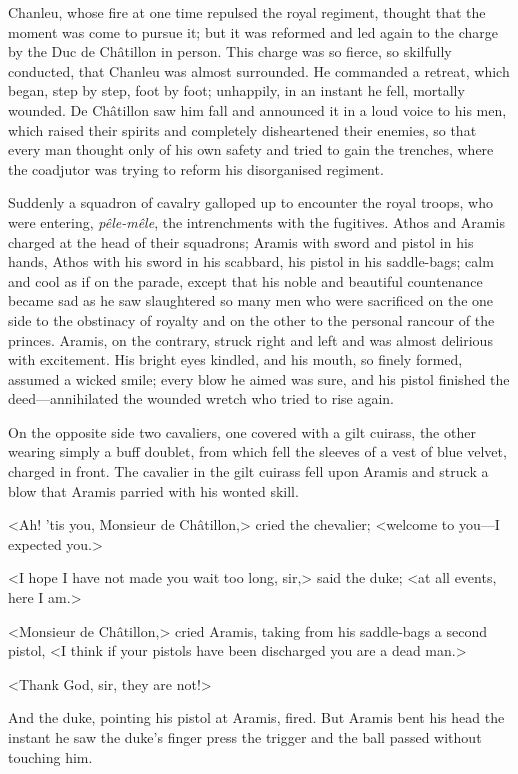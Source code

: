 Chanleu, whose fire at one time repulsed the royal regiment, thought that the moment was come to pursue it; but it was reformed and led again to the charge by the Duc de Châtillon in person. This charge was so fierce, so skilfully conducted, that Chanleu was almost surrounded. He commanded a retreat, which began, step by step, foot by foot; unhappily, in an instant he fell, mortally wounded. De Châtillon saw him fall and announced it in a loud voice to his men, which raised their spirits and completely disheartened their enemies, so that every man thought only of his own safety and tried to gain the trenches, where the coadjutor was trying to reform his disorganised regiment.

Suddenly a squadron of cavalry galloped up to encounter the royal troops, who were entering, \textit{pêle-mêle}, the intrenchments with the fugitives. Athos and Aramis charged at the head of their squadrons; Aramis with sword and pistol in his hands, Athos with his sword in his scabbard, his pistol in his saddle-bags; calm and cool as if on the parade, except that his noble and beautiful countenance became sad as he saw slaughtered so many men who were sacrificed on the one side to the obstinacy of royalty and on the other to the personal rancour of the princes. Aramis, on the contrary, struck right and left and was almost delirious with excitement. His bright eyes kindled, and his mouth, so finely formed, assumed a wicked smile; every blow he aimed was sure, and his pistol finished the deed—annihilated the wounded wretch who tried to rise again.

On the opposite side two cavaliers, one covered with a gilt cuirass, the other wearing simply a buff doublet, from which fell the sleeves of a vest of blue velvet, charged in front. The cavalier in the gilt cuirass fell upon Aramis and struck a blow that Aramis parried with his wonted skill.

<Ah! 'tis you, Monsieur de Châtillon,> cried the chevalier; <welcome to you—I expected you.>

<I hope I have not made you wait too long, sir,> said the duke; <at all events, here I am.>

<Monsieur de Châtillon,> cried Aramis, taking from his saddle-bags a second pistol, <I think if your pistols have been discharged you are a dead man.>

<Thank God, sir, they are not!>

And the duke, pointing his pistol at Aramis, fired. But Aramis bent his head the instant he saw the duke's finger press the trigger and the ball passed without touching him.

